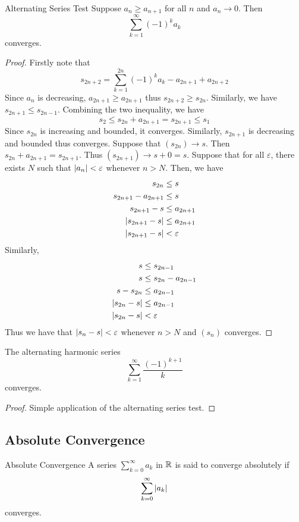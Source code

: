 \documentclass[a4paper]{article}
\begin{document}
\begin{thm}{Alternating Series Test}{} Suppose $a_n\geq a_{n+1}$ for all $n$ and $a_n\to0$. Then $$\sum_{k=1}^{\infty}(-1)^ka_k$$ converges. \tcbline
\begin{proof} Firstly note that $$s_{2n+2}=\sum_{k=1}^{2n}(-1)^ka_k-a_{2n+1}+a_{2n+2}$$ Since $a_n$ is decreasing, $a_{2n+1}\geq a_{2n+1}$ thus $s_{2n+2}\geq s_{2n}$. Similarly, we have $s_{2n+1}\leq s_{2n-1}$. Combining the two inequality, we have $$s_2\leq s_{2n}+a_{2n+1}=s_{2n+1}\leq s_1$$ Since $s_{2n}$ is increasing and bounded, it converges. Similarly, $s_{2n+1}$ is decreasing and bounded thus converges. Suppose that $(s_{2n})\to s$. Then $s_{2n}+a_{2n+1}=s_{2n+1}$. Thus $(s_{2n+1})\to s+0=s$. Suppose that for all $\varepsilon$, there exists $N$ such that $\abs{a_{n}}<\varepsilon$ whenever $n>N$. Then, we have
\begin{align*}
s_{2n}&\leq s\\
s_{2n+1}-a_{2n+1}&\leq s\\
s_{2n+1}-s&\leq a_{2n+1}\\
\abs{s_{2n+1}-s}&\leq a_{2n+1}\\
\abs{s_{2n+1}-s}&<\varepsilon\\
\end{align*}
Similarly, 
\begin{align*}
s&\leq s_{2n-1}\\
s&\leq s_{2n}-a_{2n-1}\\
s-s_{2n}&\leq a_{2n-1}\\
\abs{s_{2n}-s}&\leq a_{2n-1}\\
\abs{s_{2n}-s}&<\varepsilon\\
\end{align*}
Thus we have that $\abs{s_n-s}<\varepsilon$ whenever $n>N$ and $(s_n)$ converges. 
\end{proof}
\end{thm}

\begin{lmm}{}{} The alternating harmonic series $$\sum_{k=1}^{\infty}\frac{(-1)^{k+1}}{k}$$ converges. \tcbline
\begin{proof} Simple application of the alternating series test. 
\end{proof}
\end{lmm}

\subsection{Absolute Convergence}
\begin{defn}{Absolute Convergence}{} A series $\sum_{k=0}^\infty a_k$ in $\mathbb{R}$ is said to converge absolutely if $$\sum_{k=0}^\infty\abs{a_k}$$ converges.
\end{defn}
\end{document}
